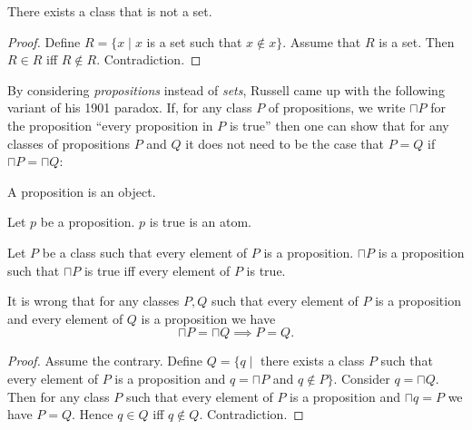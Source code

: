 \documentclass{article}
\begin{document}
  \begin{forthel}
    \begin{theorem*}
      There exists a class that is not a set.
    \end{theorem*}
    \begin{proof}
      Define $R = \{ x \mid x$ is a set such that $x \notin x \}$.
      Assume that $R$ is a set.
      Then $R \in R$ iff $R \notin R$.
      Contradiction.
    \end{proof}
  \end{forthel}

  By considering \emph{propositions} instead of \emph{sets}, Russell came up
  with the following variant of his 1901 paradox.
  If, for any class $P$ of propositions, we write $\sqcap P$ for the proposition
  ``every proposition in $P$ is true'' then one can show that for any classes of
  propositions $P$ and $Q$ it does not need to be the case that $P = Q$ if
  $\sqcap P = \sqcap Q$:

  \begin{forthel}
    \begin{signature*}
      A proposition is an object.
    \end{signature*}

    \begin{signature*}
      Let $p$ be a proposition.
      $p$ is true is an atom.
    \end{signature*}

    \begin{signature*}
      Let $P$ be a class such that every element of $P$ is a proposition.
      $\sqcap P$ is a proposition such that $\sqcap P$ is true iff every element
      of $P$ is true.
    \end{signature*}

    \begin{theorem*}
      It is wrong that for any classes $P, Q$ such that every element of $P$ is a
      proposition and every element of $Q$ is a proposition we have
      \[ \sqcap P = \sqcap Q \implies P = Q. \]
    \end{theorem*}
    \begin{proof}
      Assume the contrary.
      Define $Q = \{ q \mid$ there exists a class $P$ such that every element of
      $P$ is a proposition and $q = \sqcap P$ and $q \notin P \}$.
      Consider $q = \sqcap Q$.
      Then for any class $P$ such that every element of $P$ is a proposition and
      $\sqcap q = P$ we have $P = Q$.
      Hence $q \in Q$ iff $q \notin Q$.
      Contradiction.
    \end{proof}
  \end{forthel}
\end{document}
